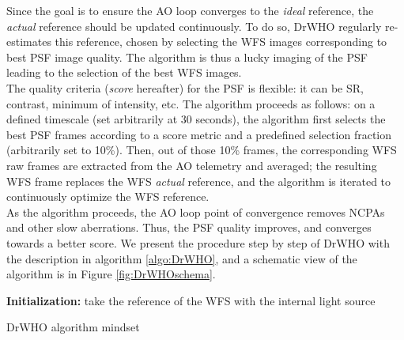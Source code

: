\documentclass[twocolumn]{aa}
\newcommand{\anthony}[1]{\textcolor{magenta}{#1}}
\begin{document}
Since the goal is to ensure the AO loop converges to the \textit{ideal} reference, the \textit{actual} reference should be updated continuously. To do so, DrWHO regularly re-estimates this reference, chosen by selecting the WFS images corresponding to best PSF image quality. The algorithm is thus a lucky imaging of the PSF leading to the selection of the best WFS images. \\
The quality criteria (\emph{score} hereafter) for the PSF is flexible: it can be SR, contrast, minimum of intensity, etc. The algorithm proceeds as follows: on a defined timescale (set arbitrarily at 30 seconds), the algorithm first selects the best PSF frames according to a score metric and a predefined selection fraction (arbitrarily set to 10\%). Then, out of those 10\% frames, the corresponding WFS raw frames are extracted from the AO telemetry and averaged; the resulting WFS frame replaces the WFS \textit{actual} reference, and the algorithm is iterated to continuously optimize the WFS reference. \\


As the algorithm proceeds, the AO loop point of convergence removes NCPAs and other slow aberrations. Thus, the PSF quality improves, and converges towards a better score. 
We present the procedure step by step of DrWHO with the  description in algorithm \ref{algo:DrWHO}, and a schematic view of the algorithm is in Figure \ref{fig:DrWHOschema}.\\


\begin{algorithm}
 \textbf{Initialization:} take the reference of the WFS with the internal light source\;
 \caption{DrWHO algorithm mindset}
 \label{algo:DrWHO}
\end{algorithm}
\end{document}
